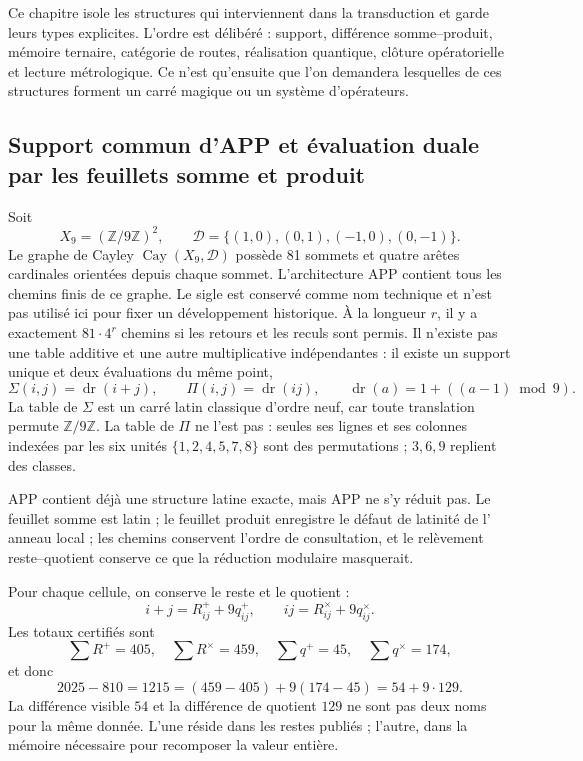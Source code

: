 Ce chapitre isole les structures qui interviennent dans la transduction et
garde leurs types explicites. L'ordre est
délibéré : support, différence somme--produit, mémoire ternaire, catégorie de
routes, réalisation quantique, clôture opératorielle et lecture métrologique. Ce n'est
qu'ensuite que l'on demandera lesquelles de ces structures forment un carré magique ou
un système d'opérateurs.

\subsection{Support commun d'APP et évaluation duale par les feuillets somme et produit}

Soit
\[
 X_9=(\mathbb Z/9\mathbb Z)^2,
 \qquad
 \mathscr D=\{(1,0),(0,1),(-1,0),(0,-1)\}.
\]
Le graphe de Cayley $\operatorname{Cay}(X_9,\mathscr D)$ possède 81 sommets et
quatre arêtes cardinales orientées depuis chaque sommet. L'architecture APP
contient tous les chemins finis de ce graphe. Le sigle est conservé comme
nom technique et n'est pas utilisé ici pour fixer un développement historique. À la longueur
$r$, il y a exactement $81\cdot4^r$ chemins si les retours et les
reculs sont permis. Il n'existe pas une table additive et une autre multiplicative indépendantes :
il existe un support unique et deux évaluations du même point,
\[
 \Sigma(i,j)=\operatorname{dr}(i+j),
 \qquad
 \Pi(i,j)=\operatorname{dr}(ij),
 \qquad
 \operatorname{dr}(a)=1+((a-1)\bmod9).
 \tag{GMC-2.1}
\]
La table de $\Sigma$ est un carré latin classique d'ordre neuf, car
toute translation permute $\mathbb Z/9\mathbb Z$. La table de $\Pi$ ne l'est pas :
seules ses lignes et ses colonnes indexées par les six unités
$\{1,2,4,5,7,8\}$ sont des permutations ; $3,6,9$ replient des classes.

\begin{resultbox}
APP contient déjà une structure latine exacte, mais APP ne s'y réduit pas.
Le feuillet somme est latin ; le feuillet produit enregistre le défaut de latinité de l'
anneau local ; les chemins conservent l'ordre de consultation, et le relèvement
reste--quotient conserve ce que la réduction modulaire masquerait.
\end{resultbox}

Pour chaque cellule, on conserve le reste et le quotient :
\[
 i+j=R^+_{ij}+9q^+_{ij},
 \qquad
 ij=R^\times_{ij}+9q^\times_{ij}.
 \tag{GMC-2.2}
\]
Les totaux certifiés sont
\[
 \sum R^+=405,
 \quad \sum R^\times=459,
 \quad \sum q^+=45,
 \quad \sum q^\times=174,
\]
et donc
\[
 2025-810=1215=(459-405)+9(174-45)=54+9\cdot129.
 \tag{GMC-2.3}
\]
La différence visible $54$ et la différence de quotient $129$ ne sont pas deux
noms pour la même donnée. L'une réside dans les restes publiés ; l'autre, dans
la mémoire nécessaire pour recomposer la valeur entière.

